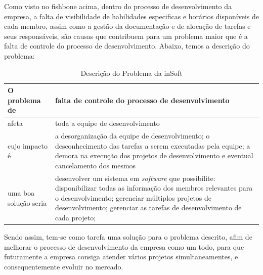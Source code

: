   Como visto no fishbone acima, dentro do processo de desenvolvimento da empresa, a falta de visibilidade de habilidades especificas e horários disponíveis de cada membro, assim como a gestão da documentação e de alocação de tarefas e seus responsáveis, são causas que contribuem para um problema maior que é a falta de controle do processo de desenvolvimento. Abaixo, temos a descrição do problema:



    \begin{table}[H]
        \centering
        \begin{tabular}{|>{\columncolor[HTML]{C0C0C0}}p{}|p{}|}
          \hline
          O problema de         &   falta de controle do processo de desenvolvimento \\ \hline
          afeta                 &   toda a equipe de desenvolvimento                 \\ \hline
          cujo impacto é        &   a desorganização da equipe de desenvolvimento;
                                    o desconhecimento das tarefas a serem executadas pela equipe;
                                    a demora na execução dos projetos de desenvolvimento e eventual cancelamento dos mesmos                                         \\ \hline
          uma boa solução seria &   desenvolver um sistema em \emph{software} que possibilite:
                                    disponibilizar todas as informação dos membros relevantes para o desenvolvimento;
                                    gerenciar múltiplos projetos de desenvolvimento;
                                    gerenciar as tarefas de desenvolvimento de cada projeto;
                                    \\ \hline
        \end{tabular}
        \caption{Descrição do Problema da inSoft}
      \end{table}



      Sendo assim, tem-se como tarefa uma solução para o problema descrito, afim de melhorar o processo de desenvolvimento da empresa como um todo, para que futuramente a empresa consiga atender vários projetos simultaneamentes, e consequentemente evoluir no mercado.
